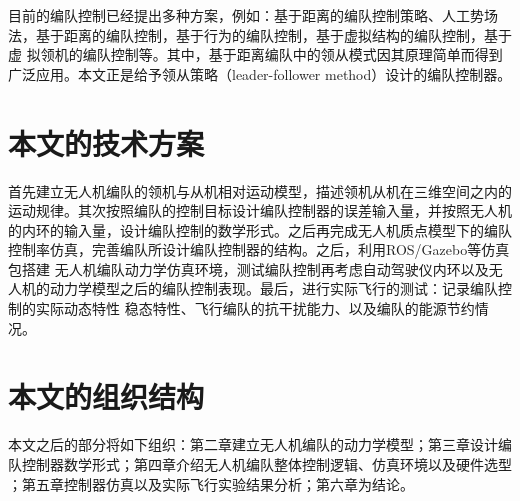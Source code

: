 目前的编队控制已经提出多种方案，例如：基于距离的编队控制策略、人工势场法，基于距离的编队控制，基于行为的编队控制，基于虚拟结构的编队控制，基于虚
拟领机的编队控制等。其中，基于距离编队中的领从模式因其原理简单而得到广泛应用。本文正是给予领从策略（leader-follower method）设计的编队控制器。
\section{本文的技术方案}
首先建立无人机编队的领机与从机相对运动模型，描述领机从机在三维空间之内的运动规律。其次按照编队的控制目标设计编队控制器的误差输入量，并按照无人机
的内环的输入量，设计编队控制的数学形式。之后再完成无人机质点模型下的编队控制率仿真，完善编队所设计编队控制器的结构。之后，利用ROS/Gazebo等仿真包搭建
无人机编队动力学仿真环境，测试编队控制再考虑自动驾驶仪内环以及无人机的动力学模型之后的编队控制表现。最后，进行实际飞行的测试：记录编队控制的实际动态特性
稳态特性、飞行编队的抗干扰能力、以及编队的能源节约情况。
\section{本文的组织结构}
本文之后的部分将如下组织：第二章建立无人机编队的动力学模型；第三章设计编队控制器数学形式；第四章介绍无人机编队整体控制逻辑、仿真环境以及硬件选型
；第五章控制器仿真以及实际飞行实验结果分析；第六章为结论。